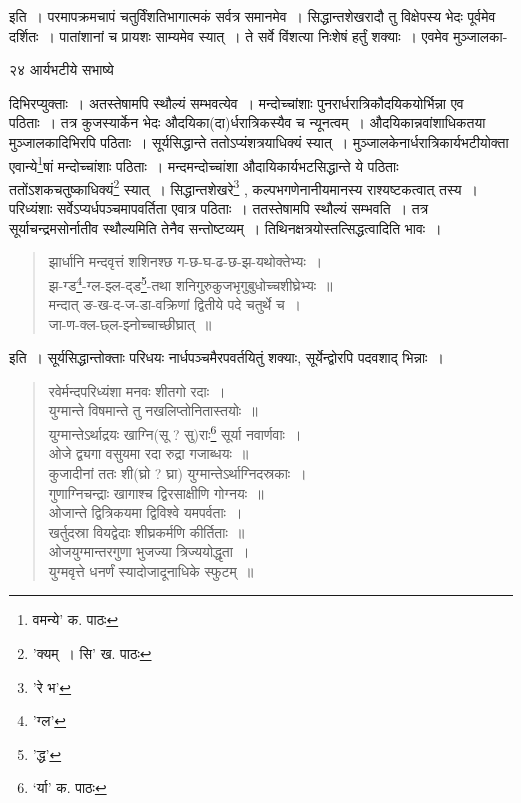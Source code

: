 \documentclass[11pt, openany]{book}
\begin{document}
{\noindent इति~। परमापक्रमचापं चतुर्विंशतिभागात्मकं सर्वत्र समानमेव~। सिद्धान्तशेखरादौ तु विक्षेपस्य भेदः पूर्वमेव दर्शितः~। पातांशानां च प्रायशः साम्यमेव स्यात्~। ते सर्वे विंशत्या निःशेषं हर्तुं शक्याः~। एवमेव मुञ्जालका-

\newpage

\vspace{3cm} २४ \hspace{4cm}आर्यभटीये सभाष्ये 

\vspace{0.3cm}
\noindent दिभिरप्युक्ताः~। अतस्तेषामपि स्थौल्यं सम्भवत्येव~। मन्दोच्चांशाः पुनरार्धरात्रिकौदयिकयोर्भिन्ना एव पठिताः~। तत्र कुजस्यार्केन भेदः औदयिका(दा)र्धरात्रिकस्यैव च न्यूनत्वम्~। औदयिकान्नवांशाधिकतया मुञ्जालकादिभिरपि पठिताः~। सूर्यसिद्धान्ते ततोऽप्यंशत्रयाधिक्यं स्यात्~। मुञ्जालकेनार्धरात्रिकार्यभटीयोक्ता एवान्ये\renewcommand{\thefootnote}{१}\footnote{वमन्ये' क. पाठः}षां मन्दोच्चांशाः पठिताः~। मन्दमन्दोच्चांशा औदायिकार्यभटसिद्धान्ते ये पठिताः ततोंऽशकचतुष्काधिक्यं\renewcommand{\thefootnote}{२}\footnote{'क्यम्~। सि' ख. पाठः} स्यात्~।
सिद्धान्तशेखरे\renewcommand{\thefootnote}{३}\footnote{'रे भ'} , कल्पभगणेनानीयमानस्य राश्यष्टकत्वात् तस्य~। परिध्यंशाः सर्वेऽप्यर्धपञ्चमापवर्तिता एवात्र पठिताः~। ततस्तेषामपि स्थौल्यं सम्भवति~। तत्र सूर्याचन्द्रमसोर्नातीव स्थौल्यमिति तेनैव सन्तोष्टव्यम्~।
तिथिनक्षत्रयोस्तत्सिद्धत्वादिति भावः~।

\begin{quote}
{\qt झार्धानि मन्दवृत्तं शशिनश्छ ग-छ-घ-ढ-छ-झ-यथोक्तेभ्यः~।\\
झ-ग्ड\renewcommand{\thefootnote}{४}\footnote{'ग्ल'}-ग्ल-झ्ल-द्ड\renewcommand{\thefootnote}{५}\footnote{'द्ध'}-तथा शनिगुरुकुजभृगुबुधोच्चशीघ्रेभ्यः~॥\\
मन्दात् ङ-ख-द-ज-डा-वक्रिणां द्वितीये पदे चतुर्थे च~।\\
जा-ण-क्ल-छ्ल-झ्नोच्चाच्छीघ्रात्~॥}
\end{quote}

इति~। सूर्यसिद्धान्तोक्ताः परिधयः नार्धपञ्चमैरपवर्तयितुं शक्याः, सूर्येन्द्वोरपि पदवशाद् भिन्नाः~।

\begin{quote}
{\qt रवेर्मन्दपरिध्यंशा मनवः शीतगो रदाः~।\\
युग्मान्ते विषमान्ते तु नखलिप्तोनितास्तयोः~॥\\
युग्मान्तेऽर्थाद्रयः खाग्नि(सू ? सु)राः\renewcommand{\thefootnote}{६}\footnote{`र्या' क. पाठः} सूर्या नवार्णवाः~।\\
ओजे द्व्यगा वसुयमा रदा रुद्रा गजाब्धयः~॥\\
कुजादीनां ततः शी(घ्रो ? घ्रा) युग्मान्तेऽर्थाग्निदस्रकाः~।\\
गुणाग्निचन्द्राः खागाश्च द्विरसाक्षीणि गोग्नयः~॥\\
ओजान्ते द्वित्रिकयमा द्विविश्वे यमपर्वताः~।\\
खर्तुदस्रा वियद्वेदाः शीघ्रकर्मणि कीर्तिताः~॥\\
ओजयुग्मान्तरगुणा भुजज्या त्रिज्ययोद्धृता~।\\
युग्मवृत्ते धनर्णं स्यादोजादूनाधिके स्फुटम्~॥}
\end{quote}

}
\end{document}
